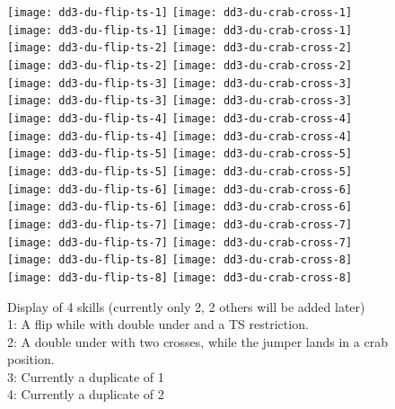 \begin{figure}
    \centering
    \texttt{[image: dd3-du-flip-ts-1]}
    \texttt{[image: dd3-du-crab-cross-1]}
    \texttt{[image: dd3-du-flip-ts-1]}
    \texttt{[image: dd3-du-crab-cross-1]}
    \texttt{[image: dd3-du-flip-ts-2]}
    \texttt{[image: dd3-du-crab-cross-2]}
    \texttt{[image: dd3-du-flip-ts-2]}
    \texttt{[image: dd3-du-crab-cross-2]}
    \texttt{[image: dd3-du-flip-ts-3]}
    \texttt{[image: dd3-du-crab-cross-3]}
    \texttt{[image: dd3-du-flip-ts-3]}
    \texttt{[image: dd3-du-crab-cross-3]}
    \texttt{[image: dd3-du-flip-ts-4]}
    \texttt{[image: dd3-du-crab-cross-4]}
    \texttt{[image: dd3-du-flip-ts-4]}
    \texttt{[image: dd3-du-crab-cross-4]}
    \texttt{[image: dd3-du-flip-ts-5]}
    \texttt{[image: dd3-du-crab-cross-5]}
    \texttt{[image: dd3-du-flip-ts-5]}
    \texttt{[image: dd3-du-crab-cross-5]}
    \texttt{[image: dd3-du-flip-ts-6]}
    \texttt{[image: dd3-du-crab-cross-6]}
    \texttt{[image: dd3-du-flip-ts-6]}
    \texttt{[image: dd3-du-crab-cross-6]}
    \texttt{[image: dd3-du-flip-ts-7]}
    \texttt{[image: dd3-du-crab-cross-7]}
    \texttt{[image: dd3-du-flip-ts-7]}
    \texttt{[image: dd3-du-crab-cross-7]}
    \texttt{[image: dd3-du-flip-ts-8]}
    \texttt{[image: dd3-du-crab-cross-8]}
    \texttt{[image: dd3-du-flip-ts-8]}
    \texttt{[image: dd3-du-crab-cross-8]}
    \label{fig:skills}
    \caption[DD3 skill flows]{
        Display of 4 skills (currently only 2, 2 others will be added later) \\
        1: A flip while with double under and a TS restriction. \\
        2: A double under with two crosses, while the jumper lands in a crab position. \\
        3: Currently a duplicate of 1 \\
        4: Currently a duplicate of 2 \\
    }
\end{figure}